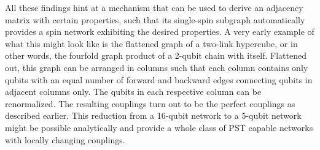 \begin{center}
\end{center}

\noindent All these findings hint at a mechanism that can be used to derive an adjacency matrix with certain properties, such that its single-spin subgraph automatically provides a spin network exhibiting the desired properties. A very early example of what this might look like is the flattened graph of a two-link hypercube, or in other words, the fourfold graph product of a 2-qubit chain with itself. Flattened out, this graph can be arranged in columns such that each column contains only qubits with an equal number of forward and backward edges connecting qubits in adjacent columns only. The qubits in each respective column can be renormalized. The resulting couplings turn out to be the perfect couplings as described earlier. This reduction from a 16-qubit network to a 5-qubit network might be possible analytically and provide a whole class of PST capable networks with locally changing couplings.


